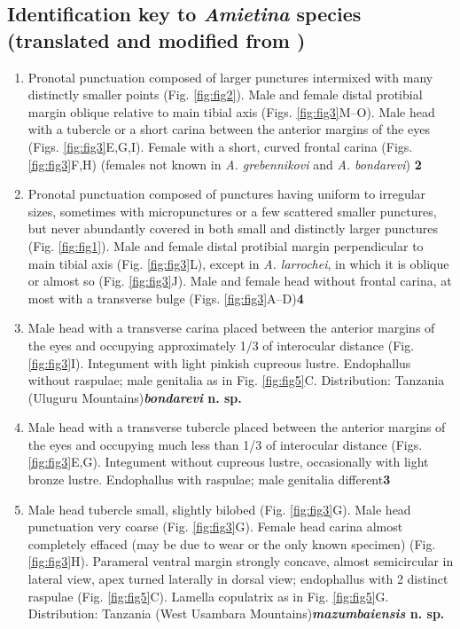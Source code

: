 \documentclass[fleqn,10pt,lineno]{wlpeerj}
\begin{document}
\subsection*{Identification key to \textit{Amietina} species (translated and modified from \cite{branco1989deux})}\hspace*{1pt}
\begin{enumerate}
\item[1.] Pronotal punctuation composed of larger punctures intermixed with many distinctly smaller points (Fig. \ref{fig:fig2}). Male and female distal protibial margin oblique relative to main tibial axis (Figs. \ref{fig:fig3}M--O). Male head with a tubercle or a short carina between the anterior margins of the eyes (Figs. \ref{fig:fig3}E,G,I). Female with a short, curved frontal carina (Figs. \ref{fig:fig3}F,H) (females not known in \textit{A. grebennikovi} and \textit{A. bondarevi}) \dotfill\textbf{2}
\item[--] Pronotal punctuation composed of punctures having uniform to irregular sizes, sometimes with micropunctures or a few scattered smaller punctures, but never abundantly covered in both small and distinctly larger punctures (Fig. \ref{fig:fig1}). Male and female distal protibial margin perpendicular to main tibial axis (Fig. \ref{fig:fig3}L), except in \textit{A. larrochei}, in which it is oblique or almost so (Fig. \ref{fig:fig3}J). Male and female head without frontal carina, at most with a transverse bulge (Figs. \ref{fig:fig3}A--D)\dotfill\textbf{4}
\item [2.] Male head with a transverse carina placed between the anterior margins of the eyes and occupying approximately 1/3 of interocular distance (Fig. \ref{fig:fig3}I). Integument with light pinkish cupreous lustre. Endophallus without raspulae; male genitalia as in Fig. \ref{fig:fig5}C. Distribution: Tanzania (Uluguru Mountains)\dotfill\textbf{\textit{bondarevi} n. sp.}
\item [--] Male head with a transverse tubercle placed between the anterior margins of the eyes and occupying much less than 1/3 of interocular distance (Figs. \ref{fig:fig3}E,G). Integument without cupreous lustre, occasionally with light bronze lustre. Endophallus with raspulae; male genitalia different\dotfill\textbf{3}
\item [3.] Male head tubercle small, slightly bilobed (Fig. \ref{fig:fig3}G). Male head punctuation very coarse (Fig. \ref{fig:fig3}G). Female head carina almost completely effaced (may be due to wear or the only known specimen) (Fig. \ref{fig:fig3}H). Parameral ventral margin strongly concave, almost semicircular in lateral view, apex turned laterally in dorsal view; endophallus with 2 distinct raspulae (Fig. \ref{fig:fig5}C). Lamella copulatrix as in Fig. \ref{fig:fig5}G. Distribution: Tanzania (West Usambara Mountains)\dotfill\textbf{\textit{mazumbaiensis} n. sp.}

\end{enumerate}
\end{document}
